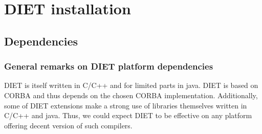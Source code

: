 
\chapter{DIET installation}
\label{ch:installing}

\section{Dependencies}
\label{sec:dependencies}

\subsection{General remarks on DIET platform dependencies}

DIET is itself written in C/C++ and for limited parts in java. DIET is
based on CORBA and thus depends on the chosen CORBA implementation.
Additionally, some of DIET extensions make a strong use of libraries
themselves written in C/C++ and java.
Thus, we could expect DIET to be effective on any platform offering
decent version of such compilers.

